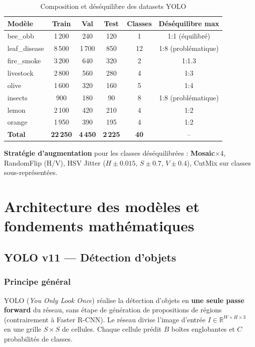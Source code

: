 \begin{table}[H]\centering
\caption{Composition et déséquilibre des datasets YOLO}
\label{tab:eda_yolo}
\small
\begin{tabular}{lccccc}
\toprule
\textbf{Modèle} & \textbf{Train} & \textbf{Val} & \textbf{Test} & \textbf{Classes} & \textbf{Déséquilibre max} \\
\midrule
bee\_obb      & 1\,200 & 240   & 120 & 1  & 1:1 (équilibré) \\
leaf\_disease & 8\,500 & 1\,700 & 850 & 12 & 1:8 (problématique) \\
fire\_smoke   & 3\,200 & 640   & 320 & 2  & 1:1.3 \\
livestock     & 2\,800 & 560   & 280 & 4  & 1:3 \\
olive         & 1\,600 & 320   & 160 & 5  & 1:4 \\
insects       & 900    & 180   & 90  & 8  & 1:8 (problématique) \\
lemon         & 2\,100 & 420   & 210 & 4  & 1:2 \\
orange        & 1\,950 & 390   & 195 & 4  & 1:2 \\
\midrule
\textbf{Total} & \textbf{22\,250} & \textbf{4\,450} & \textbf{2\,225} & \textbf{40} & -- \\
\bottomrule
\end{tabular}
\end{table}

\noindent\textbf{Stratégie d'augmentation} pour les classes déséquilibrées :
\textbf{Mosaic}$\times$4, RandomFlip (H/V), HSV Jitter
($H\!\pm\!0.015$, $S\!\pm\!0.7$, $V\!\pm\!0.4$), CutMix sur classes sous-représentées.

\section{Architecture des modèles et fondements mathématiques}

\subsection{YOLO v11 — Détection d'objets}

\subsubsection{Principe général}

YOLO (\textit{You Only Look Once}) \cite{redmon2016yolo} réalise la détection d'objets
en \textbf{une seule passe forward} du réseau, sans étape de génération de propositions
de régions (contrairement à Faster R-CNN). Le réseau divise l'image d'entrée
$I \in \mathbb{R}^{W \times H \times 3}$ en une grille $S \times S$ de cellules.
Chaque cellule prédit $B$ boîtes englobantes et $C$ probabilités de classes.

